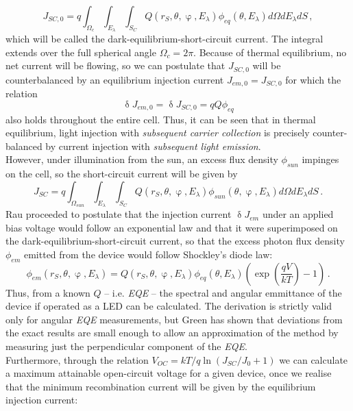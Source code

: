 \documentclass[a4paper]{article}
\begin{document}
\begin{equation}
J_{SC,0}=q \int _{\Omega _{c}} \int _{E_{\lambda}} \int _{S_C} Q(r_S, \theta, \upvarphi, E_{\lambda}) \phi_{eq} (\theta, E_{\lambda}) d\Omega dE_{\lambda}dS \, ,
\end{equation}
which will be called the dark-equilibrium-short-circuit current. The integral extends over the full spherical angle $\Omega _{c} = 2\pi$. 
Because of thermal equilibrium, no net current will be flowing, so we can postulate that $J_{SC,0}$ will be counterbalanced by an equilibrium injection current $J_{em,0}=J_{SC,0}$ for which the relation 
\begin{equation}
\updelta J_{em,0}=\updelta J_{SC,0} = q Q \phi_{eq}
\end{equation}
also holds throughout the entire cell. Thus, it can be seen that in thermal equilibrium, light injection with \emph{subsequent carrier collection} is precisely counter-balanced by current injection with \emph{subsequent light emission}.\\
However, under illumination from the sun, an excess flux density $\phi_{sun}$ impinges on the cell, so the short-circuit current will be given by
\begin{equation}
J_{SC}=q \int _{\Omega _{sun}} \int _{E_{\lambda}} \int _{S_C} Q(r_S, \theta, \upvarphi, E_{\lambda}) \phi_{sun} (\theta , \upvarphi , E_{\lambda}) d\Omega dE_{\lambda}dS \, .
\end{equation}
Rau proceeded to postulate that the injection current $\updelta J_{em}$ under an applied bias voltage would follow an exponential law and that it were superimposed on the dark-equilibrium-short-circuit current, so that the excess photon flux density $\phi_{em}$ emitted from the device would follow Shockley's diode law:
\begin{equation}
\phi_{em}(r_S, \theta, \upvarphi, E_{\lambda})=Q(r_S, \theta, \upvarphi, E_{\lambda}) \phi_{eq} (\theta, E_{\lambda}) (\exp (\frac{qV}{kT})-1) \, .
\end{equation}
Thus, from a known $Q$ -- i.e. \emph{EQE} -- the spectral and angular emmittance of the device if operated as a LED can be calculated. The derivation is strictly valid only for angular \emph{EQE} measurements, but Green has shown that deviations from the exact results are small enough to allow an approximation of the method by measuring just the perpendicular component of the \emph{EQE}.\\
Furthermore, through the relation $V_{OC}=kT/q \ln (J_{SC}/J_0 +1)$ we can calculate a maximum attainable open-circuit voltage for a given device, once we realise that the minimum recombination current will be given by the equilibrium injection current:
\end{document}
